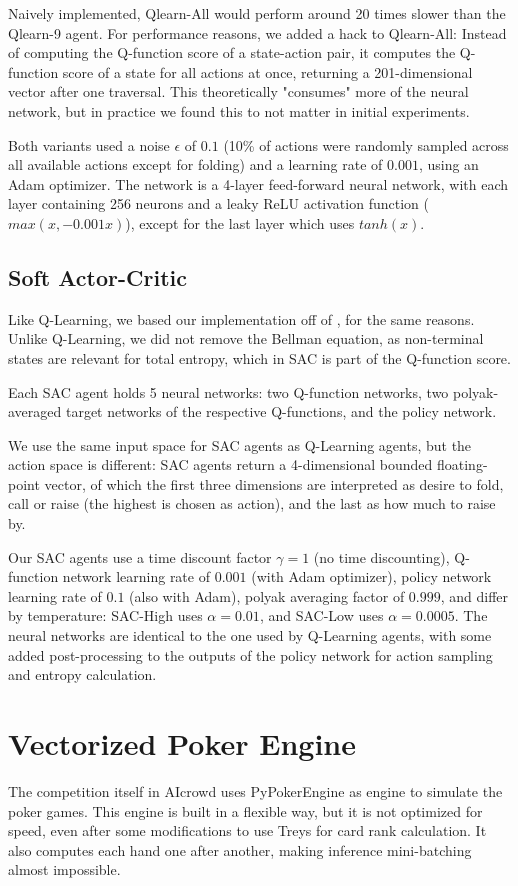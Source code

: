 Naively implemented, Qlearn-All would perform around 20 times slower than the Qlearn-9 agent. For performance reasons, we added a hack to Qlearn-All: Instead of computing the Q-function score of a state-action pair, it computes the Q-function score of a state for all actions at once, returning a 201-dimensional vector after one traversal. This theoretically "consumes" more of the neural network, but in practice we found this to not matter in initial experiments.

Both variants used a noise $\epsilon$ of $0.1$ (10\% of actions were randomly sampled across all available actions except for folding) and a learning rate of $0.001$, using an Adam optimizer. The network is a 4-layer feed-forward neural network, with each layer containing 256 neurons and a leaky ReLU activation function ($max(x, -0.001x)$), except for the last layer which uses $tanh(x)$.

\subsection{Soft Actor-Critic}
Like Q-Learning, we based our implementation off of \cite{SpinningUp2018}, for the same reasons. Unlike Q-Learning, we did not remove the Bellman equation, as non-terminal states are relevant for total entropy, which in SAC is part of the Q-function score.

Each SAC agent holds 5 neural networks: two Q-function networks, two polyak-averaged target networks of the respective Q-functions, and the policy network.

We use the same input space for SAC agents as Q-Learning agents, but the action space is different: SAC agents return a 4-dimensional bounded floating-point vector, of which the first three dimensions are interpreted as desire to fold, call or raise (the highest is chosen as action), and the last as how much to raise by.

Our SAC agents use a time discount factor $\gamma = 1$ (no time discounting), Q-function network learning rate of $0.001$ (with Adam optimizer), policy network learning rate of $0.1$ (also with Adam), polyak averaging factor of $0.999$, and differ by temperature: SAC-High uses $\alpha = 0.01$, and SAC-Low uses $\alpha = 0.0005$. The neural networks are identical to the one used by Q-Learning agents, with some added post-processing to the outputs of the policy network for action sampling and entropy calculation.

\section{Vectorized Poker Engine}
The competition itself in AIcrowd uses PyPokerEngine \cite{Pypokerengine} as engine to simulate the poker games. This engine is built in a flexible way, but it is not optimized for speed, even after some modifications to use Treys \cite{Treys} for card rank calculation. It also computes each hand one after another, making inference mini-batching almost impossible.


